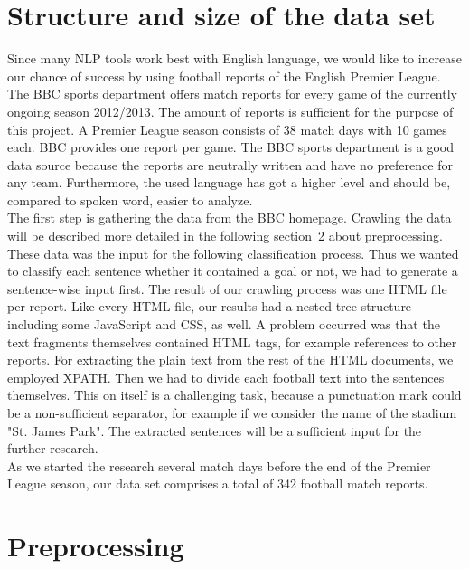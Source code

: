 \documentclass[11pt,titlepage,oneside,openany]{book}
\begin{document}
\section{Structure and size of the data set}
\label{sec:structure}

Since many NLP tools work best with English language, we would like to increase our chance of success by using football reports of the English Premier League. The BBC sports department offers match reports for every game of the currently ongoing season 2012/2013. The amount of reports is sufficient for the purpose of this project. A Premier League season consists of 38 match days with 10 games each. BBC provides one report per game. The BBC sports department is a good data source because the reports are neutrally written and have no preference for any team. Furthermore, the used language has got a higher level and should be, compared to spoken word, easier to analyze. \\

The first step is gathering the data from the BBC homepage. Crawling the data will be described more detailed in the following section~\ref{sec:preproc} about preprocessing. These data was the input for the following classification process. Thus we wanted to classify each sentence whether it contained a goal or not, we had to generate a sentence-wise input first.  The result of our crawling process was one HTML file per report. Like every HTML file, our results had a nested tree structure including some JavaScript and CSS, as well. A problem occurred was that the text fragments themselves contained HTML tags, for example references to other reports. For extracting the plain text from the rest of the HTML documents, we employed XPATH. Then we had to divide each football text into the sentences themselves. This on itself is a challenging task, because a punctuation mark could be a non-sufficient separator, for example if we consider the name of the stadium "St. James Park". The extracted sentences will be a sufficient input for the further research.\\

As we started the research several match days before the end of the Premier League season, our data set comprises a total of 342 football match reports.

\section{Preprocessing}
\label{sec:preproc}
\end{document}
